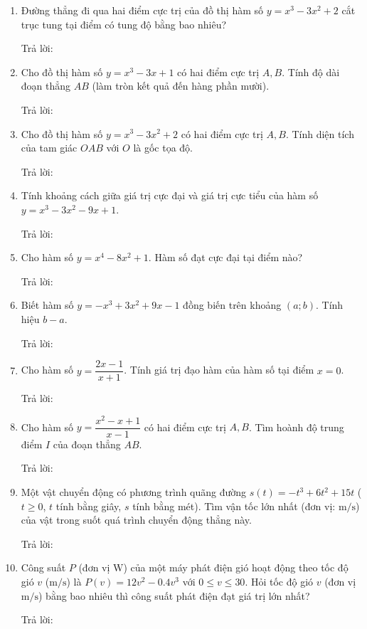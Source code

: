 \documentclass[12pt]{article}
\newcommand{\otraloi}{\underline{\hspace{5cm}}}
\begin{document}
\begin{enumerate}[label=\textbf{Câu \arabic*.}]
		\item Đường thẳng đi qua hai điểm cực trị của đồ thị hàm số $y = x^3 - 3x^2 + 2$ cắt trục tung tại điểm có tung độ bằng bao nhiêu?
		\par Trả lời: \otraloi
		
		\item Cho đồ thị hàm số $y = x^3 - 3x + 1$ có hai điểm cực trị $A, B$. Tính độ dài đoạn thẳng $AB$ (làm tròn kết quả đến hàng phần mười).
		\par Trả lời: \otraloi
		
		\item Cho đồ thị hàm số $y = x^3 - 3x^2 + 2$ có hai điểm cực trị $A, B$. Tính diện tích của tam giác $OAB$ với $O$ là gốc tọa độ.
		\par Trả lời: \otraloi
		
		\item Tính khoảng cách giữa giá trị cực đại và giá trị cực tiểu của hàm số $y = x^3 - 3x^2 - 9x + 1$.
		\par Trả lời: \otraloi
		
		\item Cho hàm số $y = x^4 - 8x^2 + 1$. Hàm số đạt cực đại tại điểm nào?
		\par Trả lời: \otraloi
		
		\item Biết hàm số $y = -x^3 + 3x^2 + 9x - 1$ đồng biến trên khoảng $(a; b)$. Tính hiệu $b - a$.
		\par Trả lời: \otraloi
		
		\item Cho hàm số $y = \dfrac{2x - 1}{x + 1}$. Tính giá trị đạo hàm của hàm số tại điểm $x = 0$.
		\par Trả lời: \otraloi
		
		\item Cho hàm số $y = \dfrac{x^2 - x + 1}{x - 1}$ có hai điểm cực trị $A, B$. Tìm hoành độ trung điểm $I$ của đoạn thẳng $AB$.
		\par Trả lời: \otraloi
		
		\item Một vật chuyển động có phương trình quãng đường $s(t) = -t^3 + 6t^2 + 15t$ ($t \ge 0$, $t$ tính bằng giây, $s$ tính bằng mét). Tìm vận tốc lớn nhất (đơn vị: $\text{m/s}$) của vật trong suốt quá trình chuyển động thẳng này.
		\par Trả lời: \otraloi
		
		\item Công suất $P$ (đơn vị $\text{W}$) của một máy phát điện gió hoạt động theo tốc độ gió $v$ ($\text{m/s}$) là $P(v) = 12v^2 - 0.4v^3$ với $0 \le v \le 30$. Hỏi tốc độ gió $v$ (đơn vị $\text{m/s}$) bằng bao nhiêu thì công suất phát điện đạt giá trị lớn nhất?
		\par Trả lời: \otraloi
		

\end{enumerate}
\end{document}
